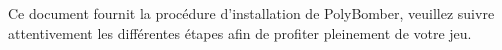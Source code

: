 	Ce document fournit la procédure d'installation de PolyBomber, veuillez suivre attentivement les différentes étapes afin de profiter pleinement de votre jeu.